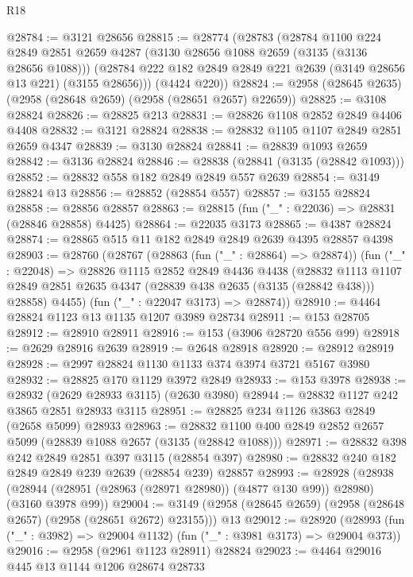 \begin{lexlean}{R18}
\begin{coremodule}
@28784 := @3121 @28656
@28815 := @28774
    (@28783
      (@28784
        @1100
        @224
        @2849
        @2851
        @2659
        @4287
        (@3130 @28656 @1088 @2659 (@3135 (@3136 @28656 @1088)))
        (@28784 @222 @182 @2849 @2849 @221 @2639 (@3149 @28656 @13 @221) (@3155 @28656)))
      (@4424 @220))
@28824 := @2958 (@28645 @2635) (@2958 (@28648 @2659) (@2958 (@28651 @2657) @22659))
@28825 := @3108 @28824
@28826 := @28825 @213
@28831 := @28826 @1108 @2852 @2849 @4406 @4408
@28832 := @3121 @28824
@28838 := @28832 @1105 @1107 @2849 @2851 @2659 @4347
@28839 := @3130 @28824
@28841 := @28839 @1093 @2659
@28842 := @3136 @28824
@28846 := @28838 (@28841 (@3135 (@28842 @1093)))
@28852 := @28832 @558 @182 @2849 @2849 @557 @2639
@28854 := @3149 @28824 @13
@28856 := @28852 (@28854 @557)
@28857 := @3155 @28824
@28858 := @28856 @28857
@28863 := @28815 (fun ("_" : @22036) => @28831 (@28846 @28858) @4425)
@28864 := @22035 @3173
@28865 := @4387 @28824
@28874 := @28865 @515 @11 @182 @2849 @2849 @2639 @4395 @28857 @4398
@28903 := @28760
    (@28767
      (@28863 (fun ("_" : @28864) => @28874))
      (fun ("_" : @22048) =>
      @28826
        @1115
        @2852
        @2849
        @4436
        @4438
        (@28832
          @1113
          @1107
          @2849
          @2851
          @2635
          @4347
          (@28839 @438 @2635 (@3135 (@28842 @438)))
          @28858)
        @4455)
      (fun ("_" : @22047 @3173) => @28874))
@28910 := @4464 @28824 @1123 @13 @1135 @1207 @3989 @28734
@28911 := @153 @28705
@28912 := @28910 @28911
@28916 := @153 (@3906 @28720 @556 @99)
@28918 := @2629 @28916 @2639
@28919 := @2648 @28918
@28920 := @28912 @28919
@28928 := @2997 @28824 @1130 @1133 @374 @3974 @3721 @5167 @3980
@28932 := @28825 @170 @1129 @3972 @2849
@28933 := @153 @3978
@28938 := @28932 (@2629 @28933 @3115) (@2630 @3980)
@28944 := @28832 @1127 @242 @3865 @2851 @28933 @3115
@28951 := @28825 @234 @1126 @3863 @2849 (@2658 @5099) @28933
@28963 := @28832 @1100 @400 @2849 @2852 @2657 @5099 (@28839 @1088 @2657 (@3135 (@28842 @1088)))
@28971 := @28832 @398 @242 @2849 @2851 @397 @3115 (@28854 @397)
@28980 := @28832 @240 @182 @2849 @2849 @239 @2639 (@28854 @239) @28857
@28993 := @28928
    (@28938 (@28944 (@28951 (@28963 (@28971 @28980)) (@4877 @130 @99)) @28980) (@3160 @3978 @99))
@29004 := @3149 (@2958 (@28645 @2659) (@2958 (@28648 @2657) (@2958 (@28651 @2672) @23155))) @13
@29012 := @28920
    (@28993 (fun ("_" : @3982) => @29004 @1132) (fun ("_" : @3981 @3173) => @29004 @373))
@29016 := @2958 (@2961 @1123 @28911) @28824
@29023 := @4464 @29016 @445 @13 @1144 @1206 @28674 @28733

\end{coremodule}
\end{lexlean}
